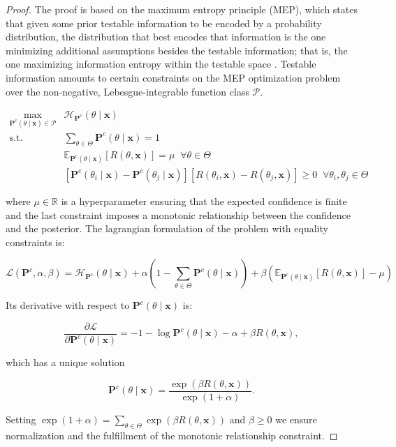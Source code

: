 \begin{proof}
    The proof is based on the maximum entropy principle (MEP), which states that
    given some prior testable information to be encoded by a probability 
    distribution, the distribution that best encodes that information is the one
    minimizing additional assumptions besides the testable information; that is, the one
    maximizing information entropy within the testable space
    \cite{logicofscience}.
    Testable information amounts to certain constraints on
    the MEP optimization problem over the non-negative, Lebesgue-integrable function class $\mathcal{P}$.

    $$
    \begin{aligned}
        \underset{\mathbf{P}^c(\theta \mid \bm{x}) \in \mathcal{P}}{\operatorname{max}} & \mathcal{H}_{\mathbf{P}^c}(\theta \mid \bm{x}) \\
        \text {s.t.} & \sum_{\theta \in \Theta} \mathbf{P}^c(\theta \mid \bm{x}) = 1 \\
        & \mathbb{E}_{\mathbf{P}^c(\theta \mid \bm{x})}[R(\theta, \bm{x})]=\mu \;\; \forall \theta \in \Theta \\
        & [\mathbf{P}^c(\theta_i \mid \bm{x}) - \mathbf{P}^c(\theta_j \mid \bm{x})][R(\theta_i, \bm{x}) - R(\theta_j, \bm{x})] \geq 0 \;\; \forall \theta_i, \theta_j \in \Theta
    \end{aligned}
    $$

    where $\mu \in \mathbb{R}$ is a hyperparameter ensuring that the expected confidence is finite
    and the last constraint imposes a monotonic relationship between the confidence and the posterior.
    The lagrangian formulation of the problem with equality constraints is:

    $$
        \mathcal{L}(\mathbf{P}^c, \alpha, \beta) = \mathcal{H}_{\mathbf{P}^c}(\theta \mid \bm{x}) + \alpha \left ( 1 - \sum_{\theta \in \Theta} \mathbf{P}^c(\theta \mid \bm{x}) \right ) +
        \beta  \left ( \mathbb{E}_{\mathbf{P}^c(\theta \mid \bm{x})}[R(\theta, \bm{x})] - \mu \right )
    $$

    Its derivative with respect to $\mathbf{P}^c(\theta \mid \bm{x})$ is:

    $$
    \frac{\partial \mathcal{L}}{\partial \mathbf{P}^c(\theta \mid \bm{x})} = -1 - \log \mathbf{P}^c(\theta \mid \bm{x}) - \alpha + \beta R(\theta, \bm{x}),
    $$

    which has a unique solution

    $$
    \mathbf{P}^c(\theta \mid \bm{x}) = \frac{\exp \left ( \beta R(\theta, \bm{x}) \right )}{\exp \left ( 1+ \alpha \right )}.
    $$

    Setting $\exp \left ( 1+ \alpha \right ) = \sum_{\theta \in \Theta} \exp \left ( \beta R(\theta, \bm{x}) \right )$ and $\beta \geq 0$ 
    we ensure normalization and the fulfillment of the monotonic relationship constraint.
\end{proof}

